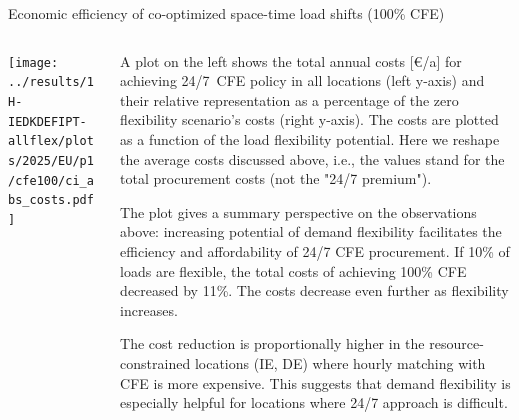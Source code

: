 \begin{frame}{Economic efficiency of co-optimized space-time load shifts (100\% CFE)}
\label{sec:efficiency}

  {\footnotesize
  \vspace{0.2cm}
  
  \begin{columns}
  \begin{column}{8cm}
  \centering
  \vspace{0.2cm}
  \texttt{[image: ../results/1H-IEDKDEFIPT-allflex/plots/2025/EU/p1/cfe100/ci\_abs\_costs.pdf]}
  \end{column}
  
  \begin{column}{7cm}
    A plot on the left shows the \alert{total annual costs [\euro/a]} for achieving 24/7~CFE policy in all locations (left y-axis) and their relative representation as a percentage of the zero flexibility scenario's costs (right y-axis). The costs are plotted as a function of the load flexibility potential. Here we reshape the average costs discussed above, i.e., the values stand for the total procurement costs (not the "24/7 premium").

    \vspace{0.1cm} 
    The plot gives a summary perspective on the observations above: increasing potential of demand flexibility facilitates the \alert{efficiency and affordability} of 24/7 CFE procurement. If 10\% of loads are flexible, the total costs of achieving 100\% CFE decreased by 11\%. The costs decrease even further as flexibility increases.

    \vspace{0.1cm} 
    The cost reduction is proportionally higher in the resource-constrained locations (IE, DE) where hourly matching with CFE is more expensive. This suggests that demand flexibility is especially helpful for locations \alert{where 24/7 approach is difficult}.

    \end{column}
  \end{columns}
  
  }
\end{frame}


